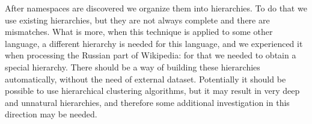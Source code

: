 After namespaces are discovered we organize them into hierarchies.
To do that we use existing hierarchies, but they are not always complete
and there are mismatches. What is more, when this technique is applied to some
other language, a different hierarchy is needed for this language, and we experienced
it when processing the Russian part of Wikipedia: for that we needed to obtain
a special hierarchy. There should be a way of building these hierarchies
automatically, without the need of external dataset.
Potentially it should be possible to use hierarchical clustering
algorithms, but it may result in very deep and unnatural hierarchies, and
therefore some additional investigation in this direction may be needed.
